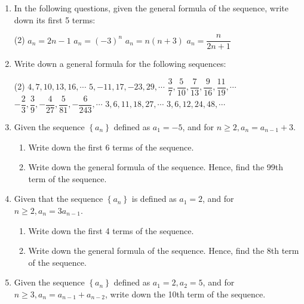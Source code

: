 \documentclass{report}
\begin{document}
\newpage
{}
\begin{enumerate}[label=\textbf{\arabic*.}]
    \item In the following questions, given the general formula of the sequence, write down its first 5 terms:
    \begin{tasks}[label=(\alph*)](2)
        \task \( a_{n}=2 n-1 \)
        \task \( a_{n}=(-3)^{n} \)
        \task \( a_{n}=n(n+3) \)
        \task \( a_{n}=\dfrac{n}{2 n+1} \)
    \end{tasks}
    
    \item Write down a general formula for the following sequences:
    \begin{tasks}[label=(\alph*)](2)
        \task \( 4,7,10,13,16, \cdots \)
        \task \( 5,-11,17,-23,29, \cdots \)
        \task \( \dfrac{3}{7}, \dfrac{5}{10}, \dfrac{7}{13}, \dfrac{9}{16}, \dfrac{11}{19}, \cdots \)
        \task \( -\dfrac{2}{3}, \dfrac{3}{9},-\dfrac{4}{27}, \dfrac{5}{81},-\dfrac{6}{243}, \cdots \)
        \task \( 3,6,11,18,27, \cdots \)
        \task \( 3,6,12,24,48, \cdots \)
    \end{tasks}
    
    \item Given the sequence \( \left\{a_{n}\right\} \) defined as \( a_{1}=-5 \), and for \( n \geq 2, a_{n}=a_{n-1}+3 \).
    \begin{enumerate}[label=(\alph*)]
        \item Write down the first 6 terms of the sequence.
        \item Write down the general formula of the sequence. Hence, find the 99th term of the sequence.
    \end{enumerate}
    
    \item Given that the sequence \( \left\{a_{n}\right\} \) is defined as \( a_{1}=2 \), and for \( n \geq 2, a_{n}=3 a_{n-1} \).
    \begin{enumerate}[label=(\alph*)]
        \item Write down the first 4 terms of the sequence.
        \item Write down the general formula of the sequence. Hence, find the 8th term of the sequence.
    \end{enumerate}
    
    \item Given the sequence \( \left\{a_{n}\right\} \) defined as \( a_{1}=2, a_{2}=5 \), and for \( n \geq 3, a_{n}=a_{n-1}+a_{n-2} \), write down the 10th term of the sequence.
    

\end{enumerate}
\end{document}

